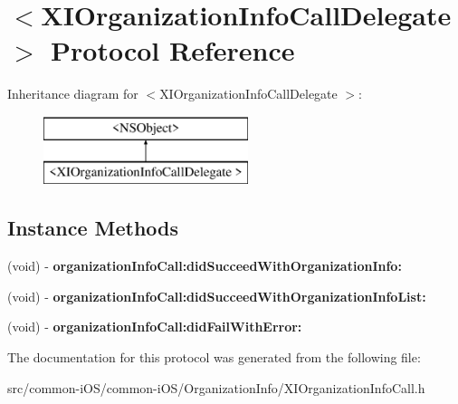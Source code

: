 \hypertarget{protocol_x_i_organization_info_call_delegate_01-p}{}\section{$<$X\+I\+Organization\+Info\+Call\+Delegate $>$ Protocol Reference}
\label{protocol_x_i_organization_info_call_delegate_01-p}
Inheritance diagram for $<$X\+I\+Organization\+Info\+Call\+Delegate $>$\+:\begin{figure}[H]
\begin{center}
\leavevmode
\includegraphics[height=2.000000cm]{protocol_x_i_organization_info_call_delegate_01-p}
\end{center}
\end{figure}
\subsection*{Instance Methods}
\begin{DoxyCompactItemize}
\item 
\hypertarget{protocol_x_i_organization_info_call_delegate_01-p_ace033356d1279a1cf7271f6b05743d13}{}\label{protocol_x_i_organization_info_call_delegate_01-p_ace033356d1279a1cf7271f6b05743d13} 
(void) -\/ {\bfseries organization\+Info\+Call\+:did\+Succeed\+With\+Organization\+Info\+:}
\item 
\hypertarget{protocol_x_i_organization_info_call_delegate_01-p_a5cf11c65b2b41d7fd3d74ff08da0b035}{}\label{protocol_x_i_organization_info_call_delegate_01-p_a5cf11c65b2b41d7fd3d74ff08da0b035} 
(void) -\/ {\bfseries organization\+Info\+Call\+:did\+Succeed\+With\+Organization\+Info\+List\+:}
\item 
\hypertarget{protocol_x_i_organization_info_call_delegate_01-p_aacd2d6ce6b151cdece173c6f847bbf21}{}\label{protocol_x_i_organization_info_call_delegate_01-p_aacd2d6ce6b151cdece173c6f847bbf21} 
(void) -\/ {\bfseries organization\+Info\+Call\+:did\+Fail\+With\+Error\+:}
\end{DoxyCompactItemize}


The documentation for this protocol was generated from the following file\+:\begin{DoxyCompactItemize}
\item 
src/common-\/i\+O\+S/common-\/i\+O\+S/\+Organization\+Info/X\+I\+Organization\+Info\+Call.\+h\end{DoxyCompactItemize}

